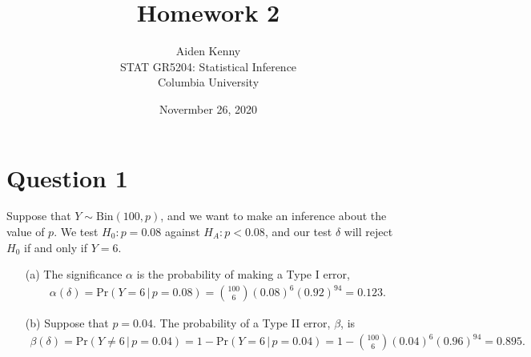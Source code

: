 \documentclass[10pt]{article}
\title{
    {\Large Homework 2}
}
\author{
    {\normalsize Aiden Kenny}\\
    {\normalsize STAT GR5204: Statistical Inference}\\
    {\normalsize Columbia University}
}
\date{\normalsize Novermber 26, 2020}
\begin{document}
\maketitle

\section{Question 1} \noindent
Suppose that \(Y \sim \mathrm{Bin}(100,p)\), and we want to make an inference about the value of \(p\). We test \(H_0 : p = 0.08\) against \(H_A : p < 0.08\),
and our test \(\delta\) will reject \(H_0\) if and only if \(Y = 6\).
\begin{itemize}
    \item[(a)] The significance \(\alpha\) is the probability of making a Type I error, 
    \begin{align*}
        \alpha(\delta)
        = \mathrm{Pr}(Y = 6 \,|\, p = 0.08)
        = \binom{100}{6} (0.08)^6 (0.92)^{94}
        = 0.123.
    \end{align*}
    \item[(b)] Suppose that \(p = 0.04\). The probability of a Type II error, \(\beta\), is
    \begin{align*}
        \beta(\delta)
        = \mathrm{Pr}(Y \neq 6 \,|\, p = 0.04)
        = 1 - \mathrm{Pr}(Y = 6 \,|\, p = 0.04)
        = 1 - \binom{100}{6} (0.04)^6 (0.96)^{94}
        = 0.895.
    \end{align*}
\end{itemize}

\newcommand{\zgam}{z_{\gamma}}
\end{document}
